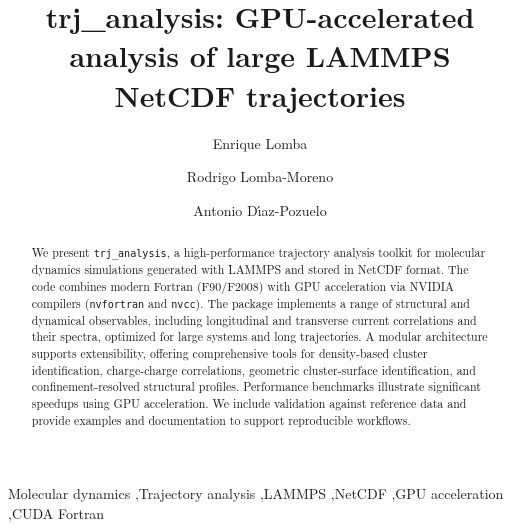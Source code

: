 \documentclass[final,1p,times]{elsarticle}
\begin{document}
\begin{frontmatter}

\title{trj\_analysis: GPU-accelerated analysis of large LAMMPS NetCDF trajectories}

\author[1,2]{Enrique Lomba}

\author[3]{Rodrigo Lomba-Moreno}

\author[1]{Antonio D\'{\i}az-Pozuelo}


\address[1]{Instituto de Qu\'{i}mica F\'{i}sica Blas Cabrera, CSIC, Madrid, Spain}
\address[2]{Grupo NAFOMAT, Facultade de Física, Universidade de Santiago de Compostela, Santiago de Compostela, Spain}
\address[3]{ETSI Ingeniería Informática, Campus de Montegancedo, Universidad Politécnica de Madrid, Madrid, Spain}

\begin{abstract}
We present \texttt{trj\_analysis}, a high-performance trajectory analysis toolkit for molecular dynamics simulations generated with LAMMPS and stored in NetCDF format. The code combines modern Fortran (F90/F2008) with GPU acceleration via NVIDIA compilers (\texttt{nvfortran} and \texttt{nvcc}). The package implements a range of structural and dynamical observables, including longitudinal and transverse current correlations and their spectra, optimized for large systems and long trajectories. A modular architecture supports extensibility, offering comprehensive tools for density-based cluster identification, charge-charge correlations, geometric cluster-surface identification, and confinement-resolved structural profiles. Performance benchmarks illustrate significant speedups using GPU acceleration. We include validation against reference data and provide examples and documentation to support reproducible workflows.
\end{abstract}

\begin{keyword}
Molecular dynamics \sep Trajectory analysis \sep LAMMPS \sep NetCDF \sep GPU acceleration \sep CUDA Fortran
\end{keyword}

\end{frontmatter}
\end{document}
